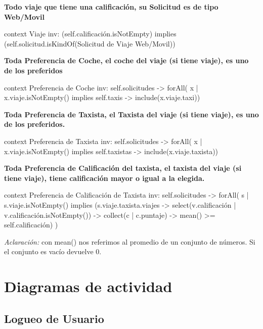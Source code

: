 \documentclass[a4paper, 10pt, twoside]{article}
\newenvironment{ocl}[1]
  {
    \textbf{#1}
    \verbatim
  }{
    \endverbatim
  }
\begin{document}
\begin{ocl}{Todo viaje que tiene una calificación, su Solicitud es de tipo Web/Movil}
  context Viaje
  inv: (self.calificación.isNotEmpty) implies
       (self.solicitud.isKindOf(Solicitud de Viaje Web/Movil)) 
\end{ocl}
 
 
\begin{ocl}{Toda Preferencia de Coche, el coche del viaje (si tiene viaje), es uno de los preferidos}
  context Preferencia de Coche
  inv: self.solicitudes -> forAll( x | x.viaje.isNotEmpty() implies 
       self.taxis -> include(x.viaje.taxi))
\end{ocl}


\begin{ocl}{Toda Preferencia de Taxista, el Taxista del viaje (si tiene viaje), es uno de los preferidos.}
  context Preferencia de Taxista
  inv: self.solicitudes -> forAll( x | x.viaje.isNotEmpty() implies 
       self.taxistas -> include(x.viaje.taxista))
\end{ocl}


\begin{ocl}{Toda Preferencia de Calificación del taxista, el taxista del viaje (si tiene viaje), tiene calificación mayor o igual a la elegida.}
  context Preferencia de Calificación de Taxista
  inv: self.solicitudes -> forAll( s | s.viaje.isNotEmpty() implies 
       (s.viaje.taxista.viajes -> select(v.calificación | v.calificación.isNotEmpty()) ->
       collect(c | c.puntaje) -> mean() >= self.calificación) )
\end{ocl}

\emph{Aclaración:} con mean() nos referimos al promedio de un conjunto de números. Si el conjunto es vacío devuelve 0.



\section{Diagramas de actividad}

\subsection{Logueo de Usuario}
\label{sec:da-logueo-de-usuario}
\end{document}
